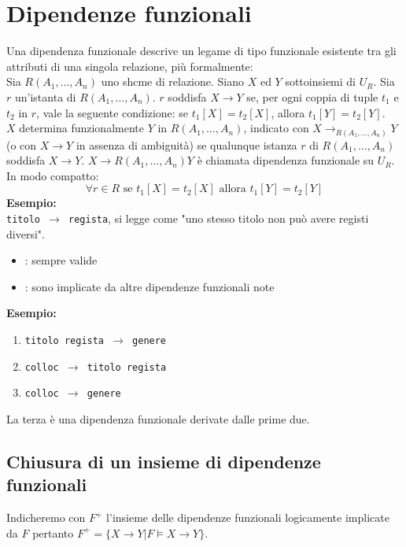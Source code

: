\documentclass[12pt, a4paper]{report}
\begin{document}
    \section{Dipendenze funzionali}
    Una dipendenza funzionale descrive un legame di tipo funzionale esistente tra gli attributi di una singola relazione, più formalmente:\\
    Sia $R(A_{1},\ldots,A_{n})$ uno shcme di relazione. Siano $X$ ed $Y$ sottoinsiemi di $U_{R}$. Sia $r$ un'istanta di $R(A_{1},\ldots,A_{n})$. $r$ soddisfa $X\rightarrow Y$ se, per ogni coppia di tuple $t_{1}$ e $t_{2}$ in $r$, vale la seguente condizione: se $t_{1}[X] = t_{2}[X]$, allora $t_{1}[Y] = t_{2}[Y]$.\\
    $X$ determina funzionalmente $Y$ in $R(A_{1},\ldots,A_{n})$, indicato con $X\rightarrow_{R(A_{1},\ldots,A_{n})}Y$ (o con $X \rightarrow Y$ in assenza di ambiguità) se qualunque istanza $r$ di $R(A_{1},\ldots,A_{n})$ soddisfa $X\rightarrow Y$. $X \rightarrow{R(A_{1},\ldots,A_{n})} Y$ è chiamata dipendenza funzionale su $U_{R}$.\\
    In modo compatto:
    \begin{equation*}
        \forall r\in R \text{ se } t_{1}[X]=t_{2}[X] \text{ allora } t_{1}[Y]=t_{2}[Y]
    \end{equation*}
    \textbf{Esempio:}\\
    \texttt{titolo $\rightarrow$ regista}, si legge come "uno stesso titolo non può avere registi diversi".
    \begin{itemize}
        \item {}: sempre valide
        \item {}: sono implicate da altre dipendenze funzionali note
    \end{itemize}
    \textbf{Esempio:}
    \begin{enumerate}
        \item \texttt{titolo regista $\rightarrow$ genere}
        \item \texttt{colloc $\rightarrow$ titolo regista}
        \item \texttt{colloc $\rightarrow$ genere}
    \end{enumerate}
    La terza è una dipendenza funzionale derivate dalle prime due.
    \subsection{Chiusura di un insieme di dipendenze funzionali}
    Indicheremo con $F^{+}$ l'insieme delle dipendenze funzionali logicamente implicate da $F$ pertanto $F^{+}=\{X\rightarrow Y | F \models X \rightarrow Y\}$.
\end{document}
